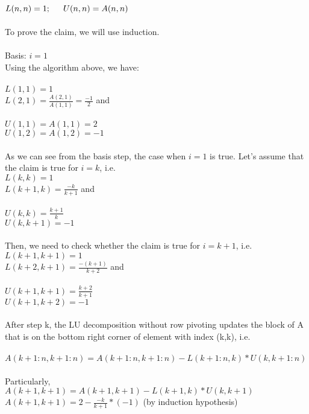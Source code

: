 \documentclass{article}
\begin{document}
\indent \hspace{5 cm} \(L(n,n) = 1; \indent U(n,n) = A(n,n)\)\\\\
\indent To prove the claim, we will use induction.\\\\
Basis: \(i=1\)\\
Using the algorithm above, we have:\\\\
\indent \(L(1,1)=1\)\\
\indent \(L(2,1)= \frac{A(2,1)}{A(1,1)}= \frac{-1}{2}\) and \\\\
\indent \(U(1,1)= A(1,1) = 2\)\\
\indent \(U(1,2)=A(1,2)=-1\)\\\\
As we can see from the basis step, the case when \(i=1\) is true. Let's assume that the claim is true for \(i=k\), i.e.\\
\indent \(L(k,k)=1\)\\
\indent \(L(k+1,k)= \frac{-k}{k+1}\) and \\\\
\indent \(U(k,k)= \frac{k+1}{k}\)\\
\indent \(U(k,k+1)=-1\)\\\\
Then, we need to check whether the claim is true for \(i=k+1\), i.e.\\ 
\indent \(L(k+1,k+1)=1\)\\
\indent \(L(k+2,k+1)= \frac{-(k+1)}{k+2}\) and \\\\
\indent \(U(k+1,k+1)= \frac{k+2}{k+1}\)\\
\indent \(U(k+1,k+2)=-1\)\\\\
After step k, the LU decomposition without row pivoting updates the block of A that is on the bottom right corner of element with index (k,k), i.e. \\\\
\indent \(A(k+1:n,k+1:n) = A(k+1:n,k+1:n) - L(k+1:n,k)*U(k,k+1:n) \)\\\\
Particularly,\\
\indent \(A(k+1,k+1)= A(k+1,k+1) - L(k+1,k)*U(k,k+1)\)\\
\indent \(A(k+1,k+1)= 2 - \frac{-k}{k+1} *(-1)\) \indent\indent (by induction hypothesis)\\
\end{document}
